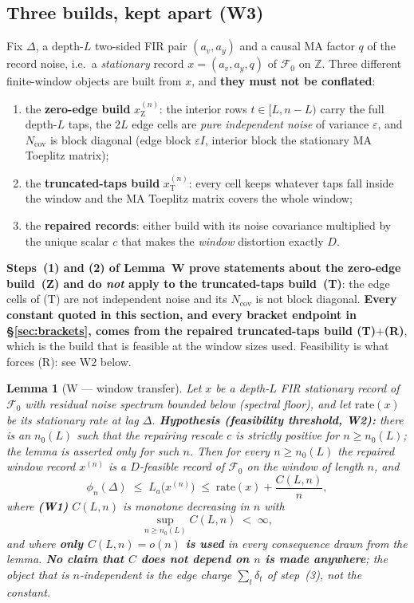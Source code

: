 \documentclass[11pt]{article}
\newtheorem{lemma}{Lemma}
\theoremstyle{definition}
\theoremstyle{remark}
\begin{document}
\subsection{Three builds, kept apart (W3)}
\label{sec:threebuilds}
Fix $\Delta$, a depth-$L$ two-sided FIR pair $(a_v,a_y)$ and a causal MA
factor $q$ of the record noise, i.e.\ a \emph{stationary} record
$x=(a_v,a_y,q)$ of $\mathcal F_0$ on $\mathbb Z$. Three different finite-window
objects are built from $x$, and \textbf{they must not be conflated}:
\begin{enumerate}
\item[(Z)] the \textbf{zero-edge build} $x^{(n)}_{\mathrm Z}$: the interior
rows $t\in[L,n-L)$ carry the full depth-$L$ taps, the $2L$ edge cells are
\emph{pure independent noise} of variance $\varepsilon$, and
$N_{\mathrm{cov}}$ is block diagonal (edge block $\varepsilon I$, interior
block the stationary MA Toeplitz matrix);
\item[(T)] the \textbf{truncated-taps build} $x^{(n)}_{\mathrm T}$: every cell
keeps whatever taps fall inside the window and the MA Toeplitz matrix covers
the whole window;
\item[(R)] the \textbf{repaired records}: either build with its noise
covariance multiplied by the unique scalar $c$ that makes the \emph{window}
distortion exactly $D$.
\end{enumerate}
\textbf{Steps~(1) and (2) of Lemma~W prove statements about the zero-edge
build~(Z) and do \emph{not} apply to the truncated-taps build~(T)}: the edge
cells of (T) are not independent noise and its $N_{\mathrm{cov}}$ is not block
diagonal. \textbf{Every constant quoted in this section, and every bracket
endpoint in \S\ref{sec:brackets}, comes from the repaired truncated-taps build
(T)$+$(R)}, which is the build that is feasible at the window sizes used.
Feasibility is what forces (R): see W2 below.

\begin{lemma}[W --- window transfer]
\label{lem:W}
Let $x$ be a depth-$L$ FIR stationary record of $\mathcal F_0$ with residual
noise spectrum bounded below (spectral floor), and let $\mathrm{rate}(x)$ be
its stationary rate at lag $\Delta$. \textbf{Hypothesis (feasibility
threshold, W2):} there is an $n_0(L)$ such that the repairing rescale $c$ is
strictly positive for $n\ge n_0(L)$; the lemma is asserted only for such $n$.
Then for every $n\ge n_0(L)$ the repaired window record $x^{(n)}$ is a
$D$-feasible record of $\mathcal F_0$ on the window of length $n$, and
\[
\phi_n(\Delta)\;\le\;L_a\bigl(x^{(n)}\bigr)\;\le\;
\mathrm{rate}(x)+\frac{C(L,n)}{n},
\]
where \textbf{(W1)} $C(L,n)$ is \emph{monotone decreasing in $n$} with
\[
\sup_{n\ge n_0(L)}C(L,n)\;<\;\infty ,
\]
and where \textbf{only $C(L,n)=o(n)$ is used} in every consequence drawn from
the lemma. \textbf{No claim that $C$ does not depend on $n$ is made anywhere};
the object that is $n$-independent is the \emph{edge charge}
$\sum_t\delta_t$ of step~(3), not the constant.
\end{lemma}
\end{document}
